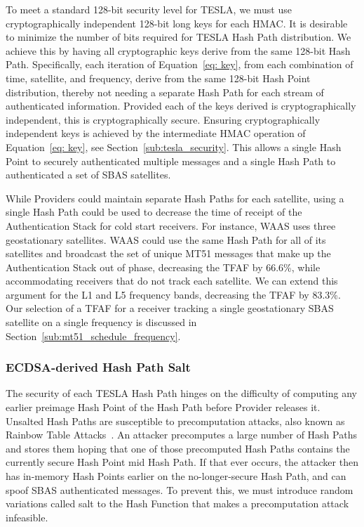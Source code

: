 \documentclass[letterpaper,times]{IONconf/IONconf}
\begin{document}
		To meet a standard 128-bit security level for TESLA, we must use cryptographically independent 128-bit long keys for each HMAC.
		It is desirable to minimize the number of bits required for TESLA Hash Path distribution.
		We achieve this by having all cryptographic keys derive from the same 128-bit Hash Path.
		Specifically, each iteration of Equation~\eqref{eq: key}, from each combination of time, satellite, and frequency, derive from the same 128-bit Hash Point distribution, thereby not needing a separate Hash Path for each stream of authenticated information.
		Provided each of the keys derived is cryptographically independent, this is cryptographically secure.
		Ensuring cryptographically independent keys is achieved by the intermediate HMAC operation of Equation~\eqref{eq: key}, see Section~\ref{sub:tesla_security}.
		This allows a single Hash Point to securely authenticated multiple messages and a single Hash Path to authenticated a set of SBAS satellites.

		While Providers could maintain separate Hash Paths for each satellite, using a single Hash Path could be used to decrease the time of receipt of the Authentication Stack for cold start receivers.
		For instance, WAAS uses three geostationary satellites.
		WAAS could use the same Hash Path for all of its satellites and broadcast the set of unique MT51 messages that make up the Authentication Stack out of phase, decreasing the TFAF by 66.6\%, while accommodating receivers that do not track each satellite.
		We can extend this argument for the L1 and L5 frequency bands, decreasing the TFAF by 83.3\%.
		Our selection of a TFAF for a receiver tracking a single geostationary SBAS satellite on a single frequency is discussed in Section~\ref{sub:mt51_schedule_frequency}.

		\subsubsection{ECDSA-derived Hash Path Salt} \label{subsub:ecdsa_salt}

			The security of each TESLA Hash Path hinges on the difficulty of computing any earlier preimage Hash Point of the Hash Path before Provider releases it.
			Unsalted Hash Paths are susceptible to precomputation attacks, also known as Rainbow Table Attacks~\cite{boneh2017graduate}.
			An attacker precomputes a large number of Hash Paths and stores them hoping that one of those precomputed Hash Paths contains the currently secure Hash Point mid Hash Path.
			If that ever occurs, the attacker then has in-memory Hash Points earlier on the no-longer-secure Hash Path, and can spoof SBAS authenticated messages.
			To prevent this, we must introduce random variations called salt to the Hash Function that makes a precomputation attack infeasible.
\end{document}
